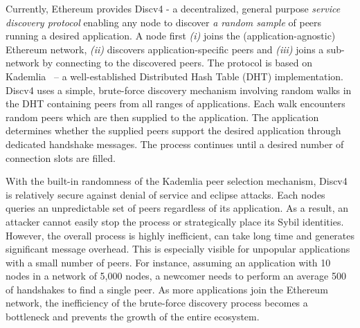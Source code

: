
 Currently, Ethereum provides Discv4 - a decentralized, general purpose \textit{service discovery protocol} enabling any node to discover \textit{a random sample} of peers running a desired application. A node first \textit{(i)} joins the (application-agnostic) Ethereum network, \textit{(ii)} discovers application-specific peers and \textit{(iii)} joins a sub-network by connecting to the discovered peers. The protocol is based on Kademlia~\cite{maymounkov2002kademlia} – a well-established Distributed Hash Table (DHT) implementation. Discv4 uses a simple, brute-force discovery mechanism involving random walks in the DHT containing peers from all ranges of applications. Each walk encounters random peers which are then supplied to the application. The application determines whether the supplied peers support the desired application through dedicated handshake messages. The process continues until a desired number of connection slots are filled. 

With the built-in randomness of the Kademlia peer selection mechanism, Discv4 is relatively secure against denial of service and eclipse attacks. Each nodes queries an unpredictable set of peers regardless of its application. As a result, an attacker cannot easily stop the process or strategically place its Sybil identities.
However, the overall process is highly inefficient, can take long time and generates significant message overhead. This is especially visible for unpopular applications with a small number of peers.  For instance, assuming an application with 10 nodes in a network of 5,000 nodes, a newcomer needs to perform an average 500 of handshakes to find a single peer. As more applications join the Ethereum network, the inefficiency of the brute-force discovery process becomes a bottleneck and prevents the growth of the entire ecosystem. 


